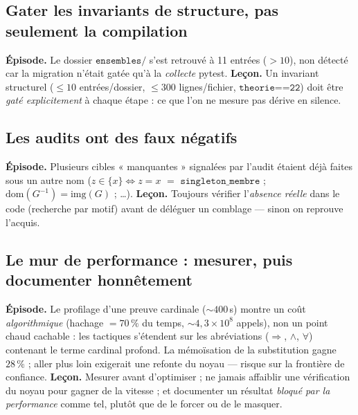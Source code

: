 \subsection{Gater les invariants de structure, pas seulement la compilation}

\textbf{Épisode.} Le dossier $\texttt{ensembles/}$ s'est retrouvé à 11 entrées
(${>}10$), non détecté car la migration n'était gatée qu'à la \emph{collecte}
pytest. \textbf{Leçon.} Un invariant structurel ($\leq 10$ entrées/dossier,
$\leq 300$ lignes/fichier, $\texttt{theorie==22}$) doit être \emph{gaté
explicitement} à chaque étape : ce que l'on ne mesure pas dérive en silence.

\subsection{Les audits ont des faux négatifs}

\textbf{Épisode.} Plusieurs cibles « manquantes » signalées par l'audit étaient
déjà faites sous un autre nom ($z\in\{x\}\Leftrightarrow z=x$ $=$
$\texttt{singleton\_membre}$ ; $\mathrm{dom}(G^{-1})=\mathrm{img}(G)$ ; \dots).
\textbf{Leçon.} Toujours vérifier l'\emph{absence réelle} dans le code (recherche
par motif) avant de déléguer un comblage --- sinon on reprouve l'acquis.

\subsection{Le mur de performance : mesurer, puis documenter honnêtement}

\textbf{Épisode.} Le profilage d'une preuve cardinale ($\sim 400$\,s) montre un
coût \emph{algorithmique} (hachage $=70\,\%$ du temps, $\sim 4{,}3\times10^{8}$
appels), non un point chaud cachable : les tactiques s'étendent sur les
abréviations ($\Rightarrow$, $\wedge$, $\forall$) contenant le terme cardinal
profond. La mémoïsation de la substitution gagne $28\,\%$ ; aller plus loin
exigerait une refonte du noyau --- risque sur la frontière de confiance.
\textbf{Leçon.} Mesurer avant d'optimiser ; ne jamais affaiblir une vérification
du noyau pour gagner de la vitesse ; et documenter un résultat \emph{bloqué par
la performance} comme tel, plutôt que de le forcer ou de le masquer.
